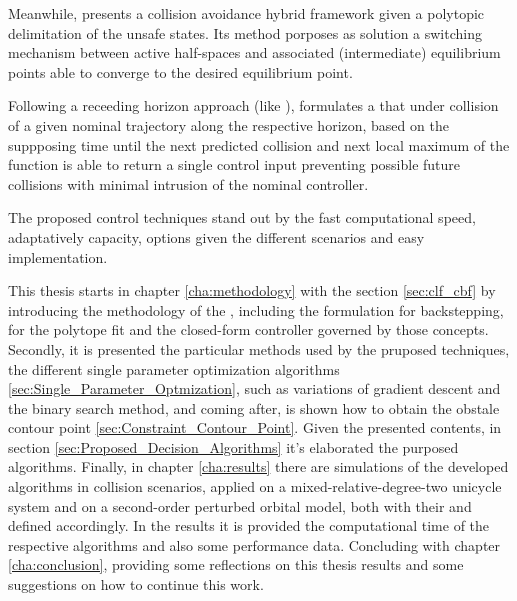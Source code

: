 Meanwhile, \cite{matias2025hybrid} presents a collision avoidance hybrid  framework given a polytopic delimitation of the unsafe states. Its method porposes as solution a switching mechanism between active half-spaces and associated (intermediate) equilibrium points able to converge to the desired equilibrium point.

Following a receeding horizon approach (like ), \cite{breeden2022predictive} formulates a  that under collision of a given nominal trajectory along the respective horizon, based on the suppposing time until the next predicted collision and next local maximum of the  function is able to return a single control input preventing possible future collisions with minimal intrusion of the nominal controller.  

The proposed control techniques stand out by the fast computational speed, adaptatively capacity, options given the different scenarios and easy implementation. 

This thesis starts in chapter \ref{cha:methodology} with the section \ref{sec:clf_cbf} by introducing the methodology of the , including the formulation for backstepping, for the polytope fit and the closed-form controller governed by those concepts. Secondly, it is presented the particular methods used by the pruposed techniques, the different single parameter optimization algorithms \ref{sec:Single_Parameter_Optmization}, such as variations of gradient descent and the binary search method, and coming after, is shown how to obtain the obstale contour point \ref{sec:Constraint_Contour_Point}. Given the presented contents, in section \ref{sec:Proposed_Decision_Algorithms} it's elaborated the purposed algorithms. Finally, in chapter \ref{cha:results} there are simulations of the developed algorithms in collision scenarios, applied on a mixed-relative-degree-two unicycle system and on a second-order perturbed orbital model, both with their  and  defined accordingly. In the results it is provided the computational time of the respective algorithms and also some performance data. Concluding with chapter \ref{cha:conclusion}, providing some reflections on this thesis results and some suggestions on how to continue this work.































